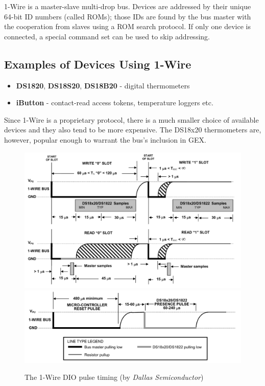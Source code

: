 1-Wire is a master-slave multi-drop bus. Devices are addressed by their unique 64-bit ID numbers (called ROMs); those IDs are found by the bus master with the cooperation from slaves using a ROM search protocol. If only one device is connected, a special command set can be used to skip addressing.

\subsection{Examples of Devices Using 1-Wire}

\begin{itemize}
	\item \textbf{DS1820}, \textbf{DS18S20}, \textbf{DS18B20} - digital thermometers
	\item \textbf{iButton} - contact-read access tokens, temperature loggers etc.
\end{itemize}

Since 1-Wire is a proprietary protocol, there is a much smaller choice of available devices and they also tend to be more expensive. The DS18x20 thermometers are, however, popular enough to warrant the bus's inclusion in GEX.


\begin{figure}[h]
	\centering
	\includegraphics[width=.85\textwidth] {img/1w-rw.png}
	\includegraphics[width=.85\textwidth] {img/1w-reset.png}
	\caption{\label{fig:1w-pulses}The 1-Wire DIO pulse timing (by \textit{Dallas Semiconductor})}
\end{figure}

